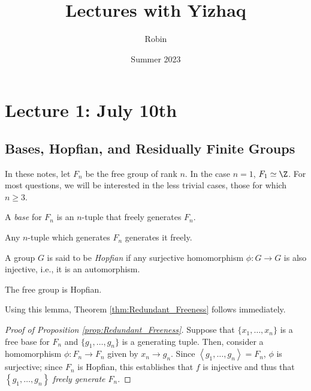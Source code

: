 \documentclass[12pt]{article}
\title{Lectures with Yizhaq}
\author{Robin}
\date{Summer 2023}
\begin{document}
\maketitle
\tableofcontents
\thispagestyle{empty}
\newpage

\section{Lecture 1: July 10th}
\subsection{Bases, Hopfian, and Residually Finite Groups}

In these notes, let $F_n$ be the free group of rank $n$. In the case $n = 1$, $F_1 \simeq \Z$. For most questions, we will be interested in the less trivial cases, those for which $n \geq 3$. 

\begin{definition}\label{def:Base_for_Free_Group}
    A \emph{base} for $F_n$ is an $n$-tuple that freely generates $F_n$.
\end{definition}

\begin{theorem}\label{thm:Redundant_Freeness}
    Any $n$-tuple which generates $F_n$ generates it freely.
\end{theorem}

\begin{definition}[Hopfian]\label{def:Hopfian}
    A group $G$ is said to be \emph{Hopfian} if any surjective homomorphism $\phi: G \rightarrow G$ is also injective, i.e., it is an automorphism. 
\end{definition}

\begin{lemma}\label{lem:The_Free_Group_is_Hopfian}
    The free group is Hopfian.
\end{lemma}

Using this lemma, Theorem \ref{thm:Redundant_Freeness} follows immediately. 

\begin{proof}[Proof of Proposition \ref{prop:Redundant_Freeness}]
    Suppose that $\{x_1, \ldots, x_n\}$ is a free base for $F_n$ and $\{g_1, \ldots, g_n\}$ is a generating tuple. Then, consider a homomorphism $\phi: F_n \rightarrow F_n$ given by $x_n \rightarrow g_n$. Since $\left<g_1, \ldots, g_n\right> = F_n$, $\phi$ is surjective; since $F_n$ is Hopfian, this establishes that $f$ is injective and thus that $\left\{g_1, \ldots, g_n\right\}$ \emph{freely generate $F_n$}.
\end{proof}
\end{document}
